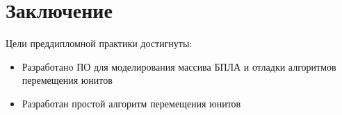 \newpage
\section{Заключение}

Цели преддипломной практики достигнуты:
\begin{itemize}

\item Разработано ПО для моделирования массива БПЛА
      и отладки алгоритмов перемещения юнитов

\item Разработан простой алгоритм перемещения юнитов

\end{itemize}
